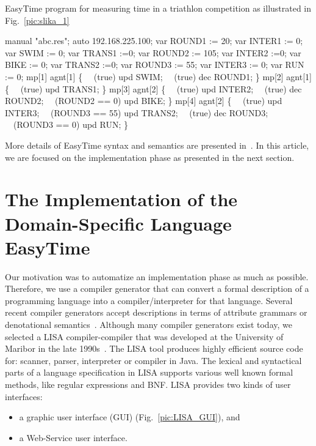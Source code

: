 \documentclass[preprint, prX]{revtex4}
\begin{document}
\begin{algorithm}[htb]
\caption{EasyTime program for measuring time in a triathlon competition as illustrated in Fig.~\ref{pic:slika_1}}
\label{alg:prog}
\small
\begin{algorithmic}[1]
 manual "abc.res";
 auto 192.168.225.100;
\STATE
\STATE var ROUND1 := 20;
\STATE var INTER1 := 0;
\STATE var SWIM := 0;
\STATE var TRANS1 :=0;
\STATE var ROUND2 := 105;
\STATE var INTER2 :=0;
\STATE var BIKE := 0;
\STATE var TRANS2 :=0;
\STATE var ROUND3 := 55;
\STATE var INTER3 := 0;
\STATE var RUN := 0;
\STATE
\STATE mp[1]  agnt[1] \{
\STATE \ \ (true)  upd SWIM;
\STATE \ \ (true)  dec ROUND1;
\STATE \}
\STATE mp[2]  agnt[1] \{
\STATE \ \ (true)   upd TRANS1;
\STATE \}
\STATE mp[3]   agnt[2] \{
\STATE \ \ (true)   upd INTER2;
\STATE \ \ (true)   dec ROUND2;
\STATE \ \ (ROUND2 == 0)   upd BIKE;
\STATE \}
\STATE mp[4]   agnt[2] \{
\STATE \ \ (true)   upd INTER3;
\STATE \ \ (ROUND3 == 55)   upd TRANS2;
\STATE \ \ (true)   dec ROUND3;
\STATE \ \ (ROUND3 == 0)   upd RUN;
\STATE \}
\end{algorithmic}
\normalsize
\end{algorithm}


More details of EasyTime syntax and semantics are presented in~\cite{Fister:2011}. In this article, we are focused on the implementation
phase as presented in the next section.

\section{The Implementation of the Domain-Specific Language EasyTime}
Our motivation was to automatize an implementation phase as much as possible. Therefore, we use a compiler generator that can convert a
formal description of a programming language into a compiler/interpreter for that language. Several recent compiler generators accept
descriptions in terms of attribute grammars or denotational semantics~\cite{Paulson:1982}. Although many compiler generators exist
today, we selected a LISA compiler-compiler that was developed at the University of Maribor in the late 1990s~\cite{Mernik:2002}. The LISA tool produces highly efficient source code for: scanner, parser, interpreter or compiler in Java. The lexical and syntactical parts of a language specification in LISA supports various well known formal methods, like regular expressions and BNF. LISA provides two kinds of user interfaces:
\begin{itemize}
  \item a graphic user interface (GUI) (Fig.~\ref{pic:LISA_GUI}), and
  \item a Web-Service user interface.
\end{itemize}
\end{document}
